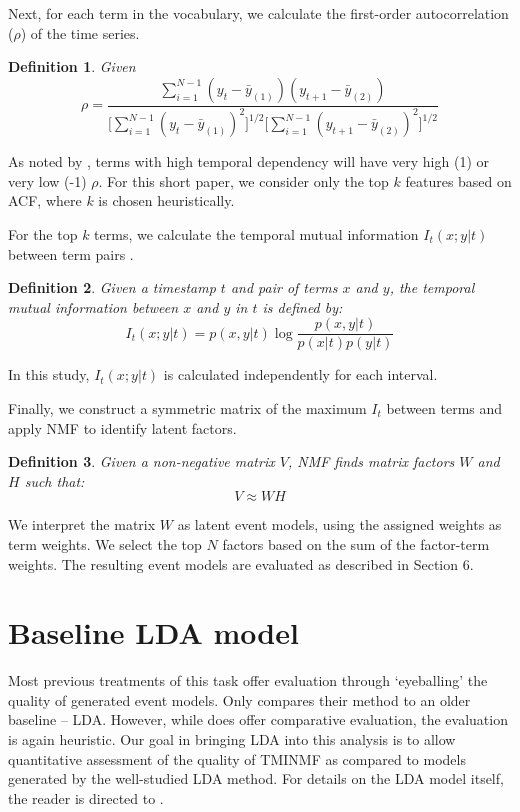 \documentclass{sig-alternate}
\newtheorem{definition}{Definition}
\begin{document}
Next, for each term in the vocabulary, we calculate the first-order autocorrelation ($\rho$) of the time series. 
\begin{definition}
 Given 
\[
\rho = \dfrac{\sum_{i=1}^{N-1} (y_t - \bar{y}_{(1)})(y_{t+1} - \bar{y}_{(2)})}{ \big [ \sum_{i=1}^{N-1}  (y_t - \bar{y}_{(1)})^2 \big ] ^{1/2} \big [\sum_{i=1}^{N-1} (y_{t+1} - \bar{y}_{(2)})^2 \big ]^{1/2}}
\]
\end{definition}

As noted by \cite{Jones2007}, terms with high temporal dependency will have very high (1) or very low (-1) $\rho$.  For this short paper, we consider only the top $k$ features based on ACF, where $k$ is chosen heuristically.

For the top $k$ terms, we calculate the temporal mutual information $I_t(x;y \vert t)$ between term pairs \cite{Teng2008}. 

\begin{definition}
Given a timestamp $t$ and pair of terms $x$ and $y$, the temporal mutual information between $x$ and $y$ in $t$ is defined by:
\[
I_t(x;y \vert t) = p(x,y \vert t) \log \dfrac{p(x,y \vert t)}{p(x \vert t) p(y \vert t)}
\]
\end{definition}

In this study, $I_t(x;y \vert t)$ is calculated independently for each interval.

Finally, we construct a symmetric matrix of the maximum $I_t$ between terms and apply NMF \cite{Lee2001} to identify latent factors. 
\begin{definition}
 Given a non-negative matrix $V$, NMF finds matrix factors $W$ and $H$ such that:
\[
V \approx WH
\]
\end{definition}

We interpret the matrix $W$ as latent event models, using the assigned weights as term weights. We select the top $N$ factors based on the sum of the factor-term weights. The resulting event models are evaluated as described in Section 6.

\section{Baseline LDA model}

Most previous treatments of this task offer evaluation through `eyeballing' the quality of generated event models. Only \cite{Weng2011} compares their  method to an older baseline -- LDA.  However, while \cite{Weng2011} does offer comparative evaluation, the evaluation is again heuristic. Our goal in bringing LDA into this analysis is to allow quantitative assessment of the quality of TMINMF as compared to models generated by the well-studied LDA method. For details on the LDA model itself, the reader is directed to \cite{Blei2003}.
\end{document}
